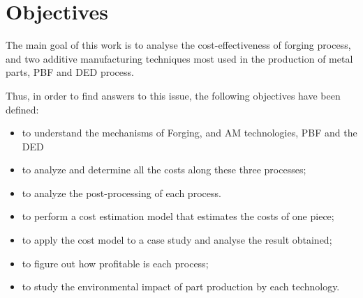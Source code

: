 \section{Objectives}
The main goal of this work is to analyse the cost-effectiveness of forging process, and two additive manufacturing techniques most used in the production of metal parts,  \ac{PBF} and \ac{DED} process.\par
Thus, in order to find answers to this issue, the following objectives have been defined:
\begin{itemize}
    \item to understand the mechanisms of Forging, and AM technologies, \ac{PBF} and the \ac{DED}
    \item to analyze and determine all the costs along these three processes;
    \item to analyze the post-processing of each process.
    \item to perform a cost estimation model that estimates the costs of one piece;
    \item to apply the cost model to a case study and analyse the result obtained;
    \item to figure out how profitable is each process;
    \item to study the environmental impact of part production by each technology.
\end{itemize}




